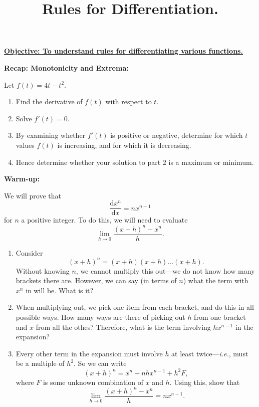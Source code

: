 \documentclass{article}
\newcommand{\deriv}[2]{\frac{\mathrm{d}#1}{\mathrm{d}#2}}
\begin{document}
\title{Rules for Differentiation.}
\date{}

\maketitle
\thispagestyle{empty}

\Large

\textbf{\underline{Objective: To understand rules for differentiating various functions.}}





\vspace{5mm}


\textbf{Recap: Monotonicity and Extrema:}

\vspace{5mm}

Let $f(t)=4t-t^2$.
\begin{enumerate}
	\item Find the derivative of $f(t)$ with respect to $t$.
	\item Solve $f'(t)=0$.
	\item By examining whether $f'(t)$ is positive or negative, determine for which $t$ values $f(t)$ is increasing, and for which it is decreasing.
	\item Hence determine whether your solution to part 2 is a maximum or minimum.
\end{enumerate}



\clearpage


\textbf{Warm-up:}

\vspace{5mm}

We will prove that
\[\deriv{x^n}{x}=nx^{n-1}\]
for $n$ a positive integer. To do this, we will need to evaluate
\[\lim_{h\to 0} \frac{(x+h)^n-x^n}{h}.\]

\begin{enumerate}
	\item Consider
		\[(x+h)^n=(x+h)(x+h)\hdots(x+h).\]
		Without knowing $n$, we cannot multiply this out---we do not know how many brackets there are. However, we can say (in terms of $n$) what the term with $x^n$ in will be. What is it?
	\item When multiplying out, we pick one item from each bracket, and do this in all possible ways. How many ways are there of picking out $h$ from one bracket and $x$ from all the othes? Therefore, what is the term involving $hx^{n-1}$ in the expansion?
	\item Every other term in the expansion must involve $h$ at least twice---\textit{i.e.}, must be a multiple of $h^2$. So we can write
		\[(x+h)^n=x^n+nhx^{n-1}+h^2F,\]
		where $F$ is some unknown combination of $x$ and $h$. Using this, show that
		\[\lim_{h\to 0} \frac{(x+h)^n-x^n}{h}=nx^{n-1}.\]
\end{enumerate}
\end{document}
